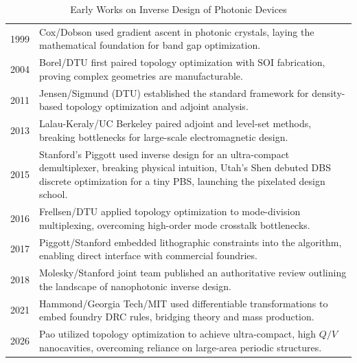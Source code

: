 \begin{table}[H] 
\centering
\begin{tabularx}{\textwidth}{l | >{\linespread{1.0}\selectfont\arraybackslash}X}
\hline \rule{0pt}{1.8em}1999 & Cox/Dobson used gradient ascent in photonic crystals, laying the mathematical foundation for band gap optimization.\cite{cox1999_maximizing} \\[1.5em]

2004 & Borel/DTU first paired topology optimization with SOI fabrication, proving complex geometries are manufacturable.\cite{borel2004_topology} \\[1.5em]

2011 & Jensen/Sigmund (DTU) established the standard framework for density-based topology optimization and adjoint analysis.\cite{jensen2011_topology} \\[1.5em]

2013 & Lalau-Keraly/UC Berkeley paired adjoint and level-set methods, breaking bottlenecks for large-scale electromagnetic design.\cite{lalaukeraly2013_adjoint} \\[1.5em]

2015 & Stanford's Piggott used inverse design for an ultra-compact demultiplexer, breaking physical intuition\cite{piggott2015_inverse_design}, Utah's Shen debuted DBS discrete optimization for a tiny PBS, launching the pixelated design school.\cite{shen2015_integrated_pbs} \\[1.5em]

2016 & Frellsen/DTU applied topology optimization to mode-division multiplexing, overcoming high-order mode crosstalk bottlenecks.\cite{frellsen2016_topology_mdm} \\[1.5em]

2017 & Piggott/Stanford embedded lithographic constraints into the algorithm, enabling direct interface with commercial foundries.\cite{piggott2017_fabrication} \\[1.5em]

2018 & Molesky/Stanford joint team published an authoritative review outlining the landscape of nanophotonic inverse design.\cite{molesky2018_inverse} \\[1.5em]

2021 & Hammond/Georgia Tech/MIT used differentiable transformations to embed foundry DRC rules, bridging theory and mass production.\cite{hammond2021_photonic} \\[1.5em]

2026 & Pao utilized topology optimization to achieve ultra-compact, high $Q/V$ nanocavities, overcoming reliance on large-area periodic structures.\cite{pao2026_nano} \\ %
\hline
\end{tabularx}
\caption{Early Works on Inverse Design of Photonic Devices}
\label{tab:early_works}
\end{table}
\clearpage

